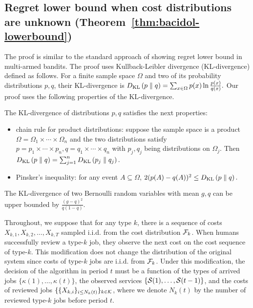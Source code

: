 \subsection{Regret lower bound when cost distributions are unknown (Theorem~\ref{thm:bacidol-lowerbound})}\label{app:thm-bacidol-lowerbound}
The proof is similar to the standard approach of showing regret lower bound in multi-armed bandits. The proof uses Kullback-Leibler divergence (KL-divergence) defined as follows. For a finite sample space $\Omega$ and two of its probability distributions $p,q$, their KL-divergence is $D_{\mathrm{KL}}\left(p \parallel q\right) = \sum_{x \in \Omega} p(x)\ln \frac{p(x)}{q(x)}.$ Our proof uses the following properties of the KL-divergence.
\begin{fact}\label{fact:KL-divergence}
The KL-divergence of distributions $p,q$ satisfies the next properties:
\begin{itemize}
\item chain rule for product distributions: suppose the sample space is a product $\Omega = \Omega_1\times \cdots \times \Omega_n$ and the two distributions satisfy $p = p_1 \times \cdots \times p_n, q = q_1 \times \cdots \times q_n$ with $p_j, q_j$ being distributions on $\Omega_j$. Then $D_{\mathrm{KL}}\left(p \parallel q\right) = \sum_{j=1}^n D_{\mathrm{KL}}\left(p_j \parallel q_j\right).$
\item Pinsker's inequality: for any event $A \subseteq \Omega$, $2(p(A)-q(A))^2 \leq D_{\mathrm{KL}}\left(p \parallel q\right).$
\end{itemize}
\end{fact}
\begin{fact}\label{fact:bound-bernoulli}
The KL-divergence of two Bernoulli random variables with mean $g,q$ can be upper bounded by $\frac{(g-q)^2}{q(1-q)}.$
\end{fact}
Throughout, we suppose that for any type $k$, there is a sequence of costs $X_{k,1},X_{k,2},\ldots,X_{k,T}$ sampled i.i.d. from the cost distribution $\mathcal{F}_k$. When humans successfully review a type-$k$ job, they observe the next cost on the cost sequence of type-$k$. This modification does not change the distribution of the original system since costs of type-$k$ jobs are i.i.d. from $\mathcal{F}_k$. Under this modification, the decision of the algorithm in period $t$ must be a function of the types of arrived jobs $\{\kappa(1),\ldots,\kappa(t)\}$, the observed services $\{\mathcal{S}(1),\ldots,\mathcal{S}(t-1)\}$, and the costs of reviewed jobs $\{\{X_{k,i}\}_{i \leq N_k(t)}\}_{k \in \mathcal{K}}$, where we denote $N_k(t)$ by the number of reviewed type-$k$ jobs before period $t$.
